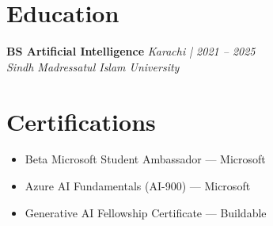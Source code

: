 \documentclass[10pt,a4paper]{article}
\newcommand{\cvdegree}[4]{%
  \textbf{#1} \hfill \textit{#3 | #4} \\
  \textit{#2}
}
\begin{document}
\section{Education}

\cvdegree{BS Artificial Intelligence}{Sindh Madressatul Islam University}{Karachi}{2021 -- 2025}

\section{Certifications}

\begin{itemize}[leftmargin=*,noitemsep]
  \item Beta Microsoft Student Ambassador — Microsoft
  \item Azure AI Fundamentals (AI-900) — Microsoft
  \item Generative AI Fellowship Certificate — Buildable
\end{itemize}
\end{document}
